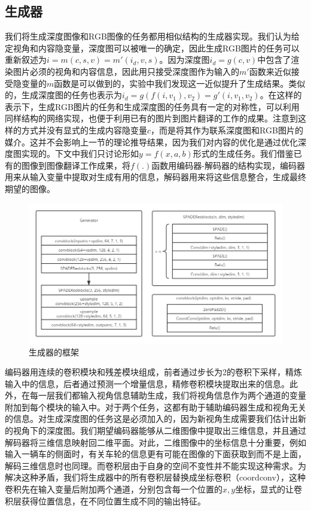 \documentclass[UTF8,openany,AutoFakeBold,AutoFakeSlant,cs4size]{ctexbook}
\begin{document}
\subsection{生成器}

我们将生成深度图像和RGB图像的任务都用相似结构的生成器实现。我们认为给定视角和内容隐变量，深度图可以被唯一的确定，因此生成RGB图片的任务可以重新叙述为$i = m(c, s, v) = m'(i_d, v, s)$。因为深度图$i_d = g(c, v)$中包含了渲染图片必须的视角和内容信息，因此用只接受深度图作为输入的$m'$函数来近似接受隐变量的$m$函数是可以做到的，实验中我们发现这一近似提升了生成结果。类似的，生成深度图的任务也表示为$i_{d} = g(f(i, v_1), v_2) = g'(i, v_1, v_2)$。在这样的表示下，生成RGB图片的任务和生成深度图的任务具有一定的对称性，可以利用同样结构的网络实现，也便于利用已有的图片到图片翻译的工作的成果。注意到这样的方式并没有显式的生成内容隐变量$c$，而是将其作为联系深度图和RGB图片的媒介。这并不会影响上一节的理论推导结果，因为我们对内容的优化是通过优化深度图实现的。下文中我们只讨论形如$y = f(x, a, b)$形式的生成任务。我们借鉴已有的图像到图像翻译工作成果，将$f(.)$函数用编码器-解码器的结构实现，编码器用来从输入变量中提取对生成有用的信息，解码器用来将这些信息整合，生成最终期望的图像。

\begin{figure}
\centering
\includegraphics[width=15cm]{./images/generator.png}
\caption{生成器的框架}
\label{model_generator}
\end{figure}


编码器用连续的卷积模块和残差模块组成，前者通过步长为2的卷积下采样，精炼输入中的信息，后者通过预测一个增量信息，精修卷积模块提取出来的信息。此外，在每一层我们都输入视角信息辅助生成，我们将视角信息作为两个通道的变量附加到每个模块的输入中。对于两个任务，这都有助于辅助编码器生成和视角无关的信息。对生成深度图的任务这是必须加入的，因为新视角生成需要我们估计出新的视角下的深度图。我们期望编码器能够从二维图像中提取出三维信息，并且通过解码器将三维信息映射回二维平面。对此，二维图像中的坐标信息十分重要，例如输入一辆车的侧面时，有关车轮的信息更有可能在图像的下面获取到而不是上面，解码三维信息时也同理。而卷积层由于自身的空间不变性并不能实现这种需求。为解决这种矛盾，我们将生成器中的所有卷积层替换成坐标卷积（coordconv），这种卷积先在输入变量后附加两个通道，分别包含每一个位置的$x,y$坐标，显式的让卷积层获得位置信息，在不同位置生成不同的输出特征。
\end{document}
